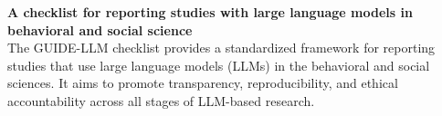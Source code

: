 \documentclass[12pt]{article}
\renewcommand{\maketitle}{
        \vspace{-1.5cm} \noindent
        \textbf{\Large{A checklist for reporting studies with large language models in behavioral and social science}} \\
}
\begin{document}
\providecommand{\gopen}{\textcolor{red}{\textbf{[OPEN]}}}
\providecommand{\guse}[1]{\textbf{U#1}}
\providecommand{\guideexpl}[1]{}

\ifdefined\inthesis\else
\maketitle

\noindent The GUIDE-LLM checklist provides a standardized framework for reporting studies that use large language models (LLMs) in the behavioral and social sciences. It aims to promote transparency, reproducibility, and ethical accountability across all stages of LLM-based research.

\vspace{0.2cm}
\fi
\end{document}
